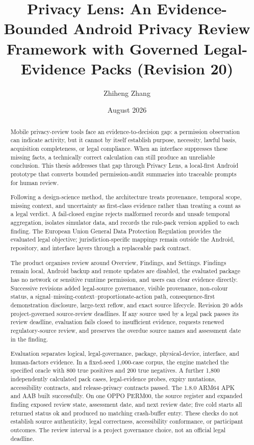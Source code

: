 \documentclass[11pt,a4paper]{article}
\title{Privacy Lens: An Evidence-Bounded Android Privacy Review Framework with Governed Legal-Evidence Packs (Revision 20)}
\author{Zhiheng Zhang}
\date{August 2026}
\begin{document}
\maketitle
\begin{abstract}
\small\singlespacing
Mobile privacy-review tools face an evidence-to-decision gap: a permission observation can indicate activity, but it cannot by itself establish purpose, necessity, lawful basis, acquisition completeness, or legal compliance. When an interface suppresses these missing facts, a technically correct calculation can still produce an unreliable conclusion. This thesis addresses that gap through Privacy Lens, a local-first Android prototype that converts bounded permission-audit summaries into traceable prompts for human review.

Following a design-science method, the architecture treats provenance, temporal scope, missing context, and uncertainty as first-class evidence rather than treating a count as a legal verdict. A fail-closed engine rejects malformed records and unsafe temporal aggregation, isolates simulator data, and records the rule-pack version applied to each finding. The European Union General Data Protection Regulation provides the evaluated legal objective; jurisdiction-specific mappings remain outside the Android, repository, and interface layers through a replaceable pack contract.

The product organises review around Overview, Findings, and Settings. Findings remain local, Android backup and remote updates are disabled, the evaluated package has no network or sensitive runtime permission, and users can clear evidence directly. Successive revisions added legal-source governance, visible provenance, non-colour status, a signal--missing-context--proportionate-action path, consequence-first demonstration disclosure, large-text reflow, and exact source lifecycle. Revision 20 adds project-governed source-review deadlines. If any source used by a legal pack passes its review deadline, evaluation fails closed to insufficient evidence, requests renewed regulatory-source review, and preserves the overdue source names and assessment date in the finding.

Evaluation separates logical, legal-governance, package, physical-device, interface, and human-factors evidence. In a fixed-seed 1,000-case corpus, the engine matched the specified oracle with 800 true positives and 200 true negatives. A further 1,800 independently calculated pack cases, legal-evidence probes, expiry mutations, accessibility contracts, and release-privacy contracts passed. The 1.8.0 ARM64 APK and AAB built successfully. On one OPPO PERM00, the source register and expanded finding exposed review state, assessment date, and next review date; five cold starts all returned status ok and produced no matching crash-buffer entry. These checks do not establish source authenticity, legal correctness, accessibility conformance, or participant outcomes. The review interval is a project governance choice, not an official legal deadline.


\end{abstract}
\end{document}
